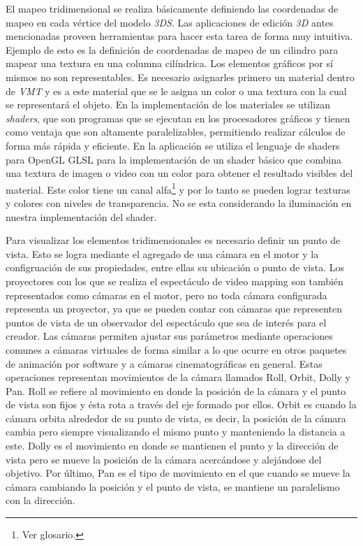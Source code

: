 El mapeo tridimensional se realiza básicamente definiendo las coordenadas de mapeo en cada vértice del modelo \emph{3DS}. Las aplicaciones de edición \emph{3D} antes mencionadas proveen herramientas para hacer esta tarea de forma muy intuitiva. Ejemplo de esto es la definición de coordenadas de mapeo de un cilindro para mapear una textura en una columna cilíndrica.
Los elementos gráficos por sí mismos no son representables. Es necesario asignarles primero un material dentro de \emph{VMT} y es a este material que se le asigna un color o una textura con la cual se representará el objeto.
En la implementación de los materiales se utilizan \emph{shaders}, que son programas que se ejecutan en los procesadores gráficos y tienen como ventaja que son altamente paralelizables, permitiendo realizar cálculos de forma más rápida y eficiente. En la aplicación se utiliza el lenguaje de shaders para OpenGL GLSL\cite{GLSL} para la implementación de un shader básico que combina una textura de imagen o video con un color para obtener el resultado visibles del material. Este color tiene un canal alfa\footnote{Ver glosario.} y por lo tanto se pueden lograr texturas y colores con niveles de transparencia. No se esta considerando la iluminación en nuestra implementación del shader.

Para visualizar los elementos tridimensionales es necesario definir un punto de vista. Esto se logra mediante el agregado de una cámara en el motor y la configruación de sus propiedades, entre ellas su ubicación o punto de vista. Los proyectores con los que se realiza el espectáculo de video mapping son también representados como cámaras en el motor, pero no toda cámara configurada representa un proyector, ya que se pueden contar con cámaras que representen puntos de vista de un observador del espectáculo que sea de interés para el creador.
Las cámaras permiten ajustar sus parámetros mediante operaciones comunes a cámaras virtuales de forma similar a lo que ocurre en otros paquetes de animación por software y a cámaras cinematográficas en general. Estas operaciones representan movimientos de la cámara llamados Roll, Orbit, Dolly y Pan. Roll se refiere al movimiento en donde la posición de la cámara y el punto de vista son fijos y ésta rota a través del eje formado por ellos. Orbit es cuando la cámara orbita alrededor de su punto de vista, es decir, la posición de la cámara cambia pero siempre visualizando el mismo punto y manteniendo la distancia a este. Dolly es el movimiento en donde se mantienen el punto y la dirección de vista pero se mueve la posición de la cámara acercándose y alejándose del objetivo. Por último, Pan es el tipo de movimiento en el que cuando se mueve la cámara cambiando la posición y el punto de vista, se mantiene un paralelismo con la dirección.

